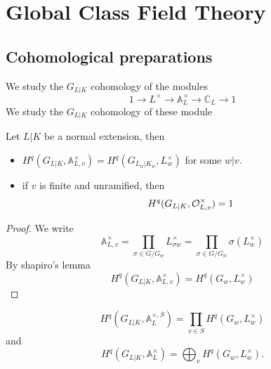 \documentclass[../main.tex]{subfiles}
\begin{document}
\section{Global Class Field Theory}
\subsection{Cohomological preparations}
We study the $G_{L|K} $ cohomology of the modules 
\[ 
1\to L^{\times}\to \mathbb{A}_L^{\times}\to \mathbb{C}_L \to 1
\]
We study the $G_{L|K} $ cohomology of these module
\begin{thm}
	Let $L|K$ be a normal extension, then
	\begin{itemize}
	\item $H^{q}( G_{L|K} , \mathbb{A}_{L, v} ^{\times})= H^{q}( G_{L_w|K_w} , L_w^{\times})  $ for some $w|v$.
	\item if $v$ is finite and unramified, then
		\[ 
		H^{q}( G_{L|K} , \mathcal{O}_{L,v} ^{\times}) =1
		\]
		
	\end{itemize}
\end{thm}
\begin{proof}
We write
\[ 
\mathbb{A}_{L,v}^{\times}= \prod_{\sigma \in G /G_w} L_{\sigma w }^{\times}= \prod_{\sigma \in G /G_w} \sigma( L_w^{\times}) 
\]
By shapiro's lemma
\[ 
H^{q}( G_{L|K} , \mathbb{A}_{L,v}^{\times}) = H^{q}( G_w, L_w^{\times}) 
\]
\end{proof}
\begin{crly}
\[ 
	H^{q}( G_{L|K} , \mathbb{A}_L^{\times,\overline{S}}) = \prod_{v\in S} H^{q}( G_w, L_w^{\times}) 
\]
and
\[ 
H^{q}( G_{L|K} , \mathbb{A}_L^{\times}) = \bigoplus_v H^{q}( G_w, L_w^{\times}).
\]
\end{crly}
		
\end{document}

